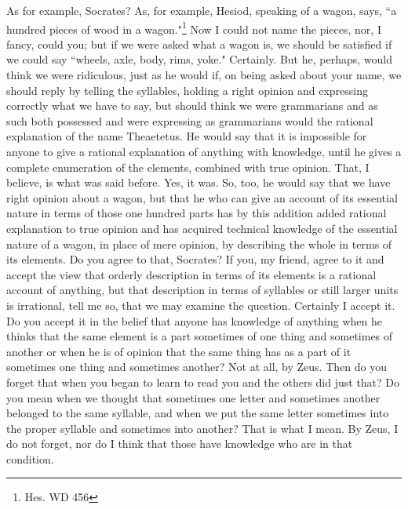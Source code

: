 \documentclass[letterpaper,12pt]{article}
\newcommand{\stephpag}[1]{\marginnote{\small\itshape\fontfamily{ppl}\selectfont #1}}
\begin{document}
\begin{drama}
\theaetetusspeaks
As for example, Socrates?
\socratesspeaks
As, for example, Hesiod, speaking of a wagon, says, ``a hundred pieces of wood in a wagon."\footnote{Hes. WD 456} Now I could not name the pieces, nor, I fancy, could you; but if we were asked what a wagon is, we should be satisfied if we could say ``wheels, axle, body, rims, yoke."
\theaetetusspeaks
Certainly.
\socratesspeaks
But he, perhaps, would think we were ridiculous, just as he would if, on being asked about your name, we should reply by telling the syllables, \stephpag{b} holding a right opinion and expressing correctly what we have to say, but should think we were grammarians and as such both possessed and were expressing as grammarians would the rational explanation of the name Theaetetus. He would say that it is impossible for anyone to give a rational explanation of anything with knowledge, until he gives a complete enumeration of the elements, combined with true opinion. That, I believe, is what was said before.
\theaetetusspeaks
Yes, it was.
\socratesspeaks
So, too, he would say that we have right opinion about a wagon, but that he who can give an account of its essential nature \stephpag{c} in terms of those one hundred parts has by this addition added rational explanation to true opinion and has acquired technical knowledge of the essential nature of a wagon, in place of mere opinion, by describing the whole in terms of its elements.
\theaetetusspeaks
Do you agree to that, Socrates?
\socratesspeaks
If you, my friend, agree to it and accept the view that orderly description in terms of its elements is a rational account of anything, but that description in terms of syllables or still larger units is irrational, \stephpag{d} tell me so, that we may examine the question.
\theaetetusspeaks
Certainly I accept it.
\socratesspeaks
Do you accept it in the belief that anyone has knowledge of anything when he thinks that the same element is a part sometimes of one thing and sometimes of another or when he is of opinion that the same thing has as a part of it sometimes one thing and sometimes another?
\theaetetusspeaks
Not at all, by Zeus.
\socratesspeaks
Then do you forget that when you began to learn to read you and the others did just that?
\theaetetusspeaks
Do you mean when we thought that sometimes one letter \stephpag{e} and sometimes another belonged to the same syllable, and when we put the same letter sometimes into the proper syllable and sometimes into another?
\socratesspeaks
That is what I mean.
\theaetetusspeaks
By Zeus, I do not forget, nor do I think that those have knowledge who are in that condition.

\end{drama}
\end{document}
